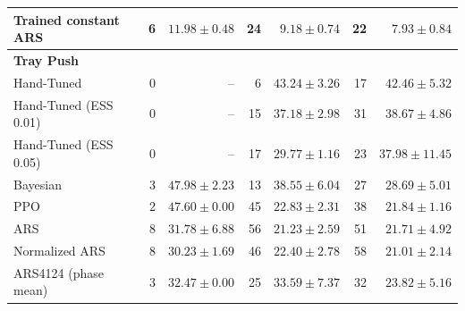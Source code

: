 \begin{table}[t]
\begin{tabular}{lrrrrrr}
Trained constant ARS & 6 & $ 11.98 \pm 0.48 $ & 24 & $ 9.18 \pm 0.74 $ & 22 & $ 7.93 \pm 0.84 $ \\
\hline
\multicolumn{7}{l}{\textbf{Tray Push}} \\
Hand-Tuned & 0 & -- & 6 & $ 43.24 \pm 3.26 $ & 17 & $ 42.46 \pm 5.32 $ \\
Hand-Tuned (ESS 0.01) & 0 & -- & 15 & $ 37.18 \pm 2.98 $ & 31 & $ 38.67 \pm 4.86 $ \\
Hand-Tuned (ESS 0.05) & 0 & -- & 17 & $ 29.77 \pm 1.16 $ & 23 & $ 37.98 \pm 11.45 $ \\
Bayesian & 3 & $ 47.98 \pm 2.23 $ & 13 & $ 38.55 \pm 6.04 $ & 27 & $ 28.69 \pm 5.01 $ \\
PPO & 2 & $ 47.60 \pm 0.00 $ & 45 & $ 22.83 \pm 2.31 $ & 38 & $ 21.84 \pm 1.16 $ \\
ARS & 8 & $ 31.78 \pm 6.88 $ & 56 & $ 21.23 \pm 2.59 $ & 51 & $ 21.71 \pm 4.92 $ \\
Normalized ARS & 8 & $ 30.23 \pm 1.69 $ & 46 & $ 22.40 \pm 2.78 $ & 58 & $ 21.01 \pm 2.14 $ \\
ARS4124 (phase mean) & 3 & $ 32.47 \pm 0.00 $ & 25 & $ 33.59 \pm 7.37 $ & 32 & $ 23.82 \pm 5.16 $ \\
\hline
\end{tabular}
\end{table}
